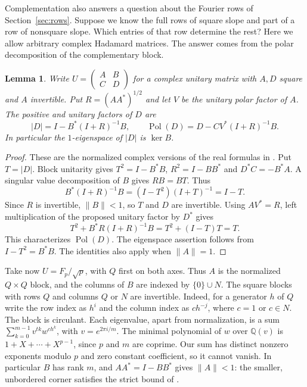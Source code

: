 \documentclass[11pt,a4paper]{article}
\newtheorem{lemma}[theorem]{Lemma}
\numberwithin{equation}{section}
\begin{document}
Complementation also answers a question about the Fourier rows of Section~\ref{sec:rows}. Suppose we know the full rows of square slope and part of a row of nonsquare slope. Which entries of that row determine the rest? Here we allow arbitrary complex Hadamard matrices. The answer comes from the polar decomposition of the complementary block.

\begin{lemma}\label{prime:polar}
Write $U=\left(\begin{smallmatrix}A&B\\ C&D\end{smallmatrix}\right)$ for a complex unitary matrix with $A,D$ square and $A$ invertible. Put $R=(AA^*)^{1/2}$ and let $V$ be the unitary polar factor of $A$. The positive and unitary factors of $D$ are
$$|D|=I-B^*(I+R)^{-1}B,\qquad
\operatorname{Pol}(D)=D-CV^*(I+R)^{-1}B.$$
In particular the $1$-eigenspace of $|D|$ is $\ker B$.
\end{lemma}
\begin{proof}
These are the normalized complex versions of the real formulas in \cite[Lemma~3.2]{bns}. Put $T=|D|$. Block unitarity gives $T^2=I-B^*B$, $R^2=I-BB^*$ and $D^*C=-B^*A$. A singular value decomposition of $B$ gives $RB=BT$. Thus
$$B^*(I+R)^{-1}B=(I-T^2)(I+T)^{-1}=I-T.$$
Since $R$ is invertible, $\|B\|<1$, so $T$ and $D$ are invertible. Using $AV^*=R$, left multiplication of the proposed unitary factor by $D^*$ gives
$$T^2+B^*R(I+R)^{-1}B=T^2+(I-T)T=T.$$
This characterizes $\operatorname{Pol}(D)$. The eigenspace assertion follows from $I-T^2=B^*B$. The identities also apply when $\|A\|=1$.
\end{proof}

Take now $U=F_p/\sqrt p$, with $Q$ first on both axes. Thus $A$ is the normalized $Q\times Q$ block, and the columns of $B$ are indexed by $\{0\}\cup N$. The square blocks with rows $Q$ and columns $Q$ or $N$ are invertible. Indeed, for a generator $h$ of $Q$ write the row index as $h^i$ and the column index as $ch^{-j}$, where $c=1$ or $c\in N$. The block is circulant. Each eigenvalue, apart from normalization, is a sum $\sum_{k=0}^{m-1}v^{tk} w^{ch^k}$, with $v=e^{2\pi i/m}$. The minimal polynomial of $w$ over $\mathbb Q(v)$ is $1+X+\cdots+X^{p-1}$, since $p$ and $m$ are coprime. Our sum has distinct nonzero exponents modulo $p$ and zero constant coefficient, so it cannot vanish. In particular $B$ has rank $m$, and $AA^*=I-BB^*$ gives $\|A\|<1$: the smaller, unbordered corner satisfies the strict bound of \cite[Lemma~3.2]{bns}.
\end{document}
